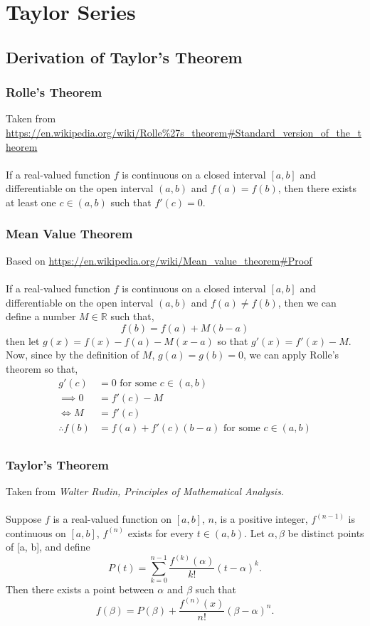 \documentclass[MathsNotesBase.tex]{subfiles}
\date{\vspace{-6ex}}
\begin{document}
\section{Taylor Series}

\subsection*{Derivation of Taylor's Theorem}
\bigskip

	\subsubsection*{Rolle's Theorem}
	Taken from \url{https://en.wikipedia.org/wiki/Rolle%27s_theorem#Standard_version_of_the_theorem}\\\\
	If a real-valued function $f$ is continuous on a closed interval $[a, b]$ and differentiable on the open interval $(a, b)$ and $f(a) = f(b)$, then there exists at least one $c \in (a, b)$ such that $f'(c) = 0$.
	
	\subsubsection*{Mean Value Theorem}
	Based on \url{https://en.wikipedia.org/wiki/Mean_value_theorem#Proof} \\\\
	If a real-valued function $f$ is continuous on a closed interval $[a, b]$ and differentiable on the open interval $(a, b)$ and $f(a) \neq f(b)$, then we can define a number $M \in \mathbb{R}$ such that,
	\[f(b) = f(a) + M(b-a)\]
	then let $g(x) = f(x) - f(a) - M(x - a)$ so that $g'(x) = f'(x) - M$. Now, since by the definition of $M$, $g(a) = g(b) = 0$, we can apply Rolle's theorem so that,
	\begin{align*}
	g'(c) &= 0 \text{ for some } c \in (a, b) \\
	\implies 0 &= f'(c) - M \\
	\iff M &= f'(c) \\
	\therefore f(b) &= f(a) + f'(c)(b - a) \text{ for some } c \in (a, b) \\
	\end{align*}
	
	\subsubsection*{Taylor's Theorem}
	Taken from \textit{Walter Rudin, Principles of Mathematical Analysis}.\\\\
	Suppose $f$ is a real-valued function on $[a, b]$, $n$, is a positive integer, $f^(n-1)$ is continuous on $[a, b]$, $f^(n)$ exists for every $t \in (a, b)$. Let $\alpha, \beta$ be distinct points of [a, b], and define
	\[ P(t) = \sum_{k = 0}^{n - 1}\frac{f^{(k)}(\alpha)}{k!}(t - \alpha)^k. \]
	Then there exists a point between $\alpha$ and $\beta$ such that
	\[ f(\beta) = P(\beta) + \frac{f^{(n)}(x)}{n!}(\beta - \alpha)^n. \]
	
\end{document}
